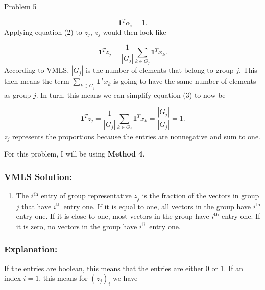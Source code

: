\begin{problem}{Problem 5}
\begin{highlight}
        \begin{equation}
            \mathbf{1}^{T}\alpha_{i} = 1.
        \end{equation}
        Applying equation (2) to $z_{j}$, $z_{j}$ would then look like

        \begin{equation}
            \mathbf{1}^{T}z_{j} = \frac{1}{|G_{j}|} \sum_{k \in G_{j}} \mathbf{1}^{T}x_{k}.
        \end{equation}
        According to VMLS, $|G_{j}|$ is the number of elements that belong to group $j$. This then means the term $\sum_{k \in G_{j}} \mathbf{1}^{T}x_{k}$ is going to have the same number of elements
        as group $j$. In turn, this means we can simplify equation (3) to now be

        \begin{equation}
            \mathbf{1}^{T}z_{j} = \frac{1}{|G_{j}|} \sum_{k \in G_{j}} \mathbf{1}^{T}x_{k} = \frac{|G_{j}|}{|G_{j}|} = 1.
        \end{equation}
        $z_{j}$ represents the proportions because the entries are nonnegative and sum to one.
    \end{highlight}

    \begin{highlight}
        \noindent For this problem, I will be using \textbf{Method 4}. 

        \subsubsection*{VMLS Solution:}

        \begin{enumerate}[label = (\alph*), start = 3]
            \item The $i^{\text{th}}$ entry of group representative $z_{j}$ is the fraction of the vectors in group $j$ that have $i^{\text{th}}$ entry one. If it is equal to one, all vectors in the group 
            have $i^{\text{th}}$ entry one. If it is close to one, most vectors in the group have $i^{\text{th}}$ entry one. If it is zero, no vectors in the group have $i^{\text{th}}$ entry one.
        \end{enumerate}

        \subsubsection*{Explanation:}

        If the entries are boolean, this means that the entries are either 0 or 1. If an index $i = 1$, this means for $(z_{j})_{i}$ we have 


\end{highlight}
\end{problem}
